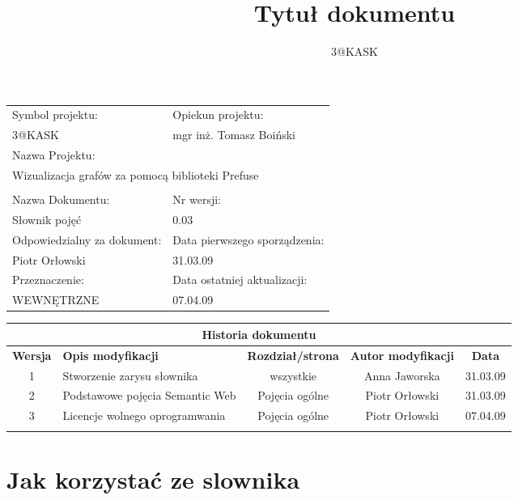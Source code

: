 \documentclass[a4paper,10pt]{article}
\title{Tytuł dokumentu}
\author{3@KASK}
\begin{document}



\maketitle


\begin{center}
\begin{tabular}{|p{7cm}|p{7cm}|}
\hline
Symbol projektu: & Opiekun projektu:   \tabularnewline 
3@KASK & mgr inż. Tomasz Boiński    \tabularnewline \hline
\multicolumn{2}{|l|}{Nazwa Projektu: } \tabularnewline
\multicolumn{2}{|l|}{Wizualizacja grafów za pomocą biblioteki Prefuse } \tabularnewline 
\hline
\multicolumn{2}{l}{ } \tabularnewline %
\hline 
Nazwa Dokumentu: & Nr wersji:   \tabularnewline 
Słownik pojęć & 0.03 \tabularnewline \hline
Odpowiedzialny za dokument: & Data pierwszego sporządzenia:   \tabularnewline 
Piotr Orłowski & 31.03.09 \tabularnewline \hline
Przeznaczenie: & Data ostatniej aktualizacji:   \tabularnewline 
WEWNĘTRZNE & 07.04.09 \tabularnewline \hline
\end{tabular}
\end{center}

\begin{center}
\begin{tabular}{|c|p{4cm}|c|c|c|}
\multicolumn{5}{c}{\textbf{Historia dokumentu}} \tabularnewline \hline
\textbf{Wersja} & \textbf{Opis modyfikacji} & \textbf{Rozdział/strona} & \textbf{Autor modyfikacji} & \textbf{Data} \tabularnewline \hline 
1 & Stworzenie zarysu słownika & wszystkie & Anna Jaworska & 31.03.09 \tabularnewline \hline
2 & Podstawowe pojęcia Semantic Web & Pojęcia ogólne & Piotr Orłowski & 31.03.09 \tabularnewline \hline
3 & Licencje wolnego oprogramwania & Pojęcia ogólne & Piotr Orłowski & 07.04.09 \tabularnewline \hline
& & & &\tabularnewline \hline
\end{tabular}
\end{center}

\newpage
\tableofcontents
\newpage

\section{Jak korzystać ze slownika}
\end{document}
